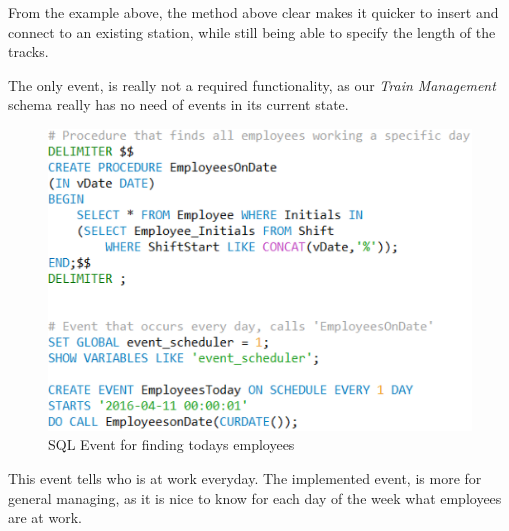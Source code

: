 From the example above, the method above clear makes it quicker to insert and connect to an existing station, while still being able to specify the length of the tracks.

The only event, is really not a required functionality, as our \emph{Train 
Management} schema really has no need of events in its current state. 

\begin{figure}[ht!]
    \centering
    \includegraphics[scale=.75]{img/SQL_EVENT}
    \caption{SQL Event for finding todays employees}
    \label{fig:event}
\end{figure}

This event tells who is at work everyday.
The implemented event, is more for general managing, as it is nice to know for 
each day of the week what employees are at work.

